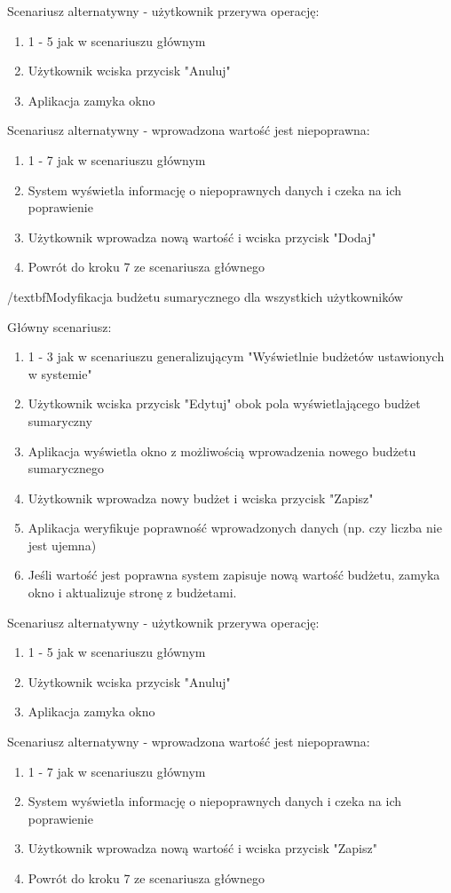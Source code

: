 Scenariusz alternatywny - użytkownik przerywa operację:
\begin{enumerate}
  \item 1 - 5 jak w scenariuszu głównym
  \item Użytkownik wciska przycisk "Anuluj"
  \item Aplikacja zamyka okno
\end{enumerate}

Scenariusz alternatywny - wprowadzona wartość jest niepoprawna:
\begin{enumerate}
  \item 1 - 7 jak w scenariuszu głównym
  \item System wyświetla informację o niepoprawnych danych i czeka na ich poprawienie
  \item Użytkownik wprowadza nową wartość i wciska przycisk "Dodaj"
  \item Powrót do kroku 7 ze scenariusza głównego
\end{enumerate}

 /textbf{Modyfikacja budżetu sumarycznego dla wszystkich użytkowników}

Główny scenariusz:
\begin{enumerate}
  \item 1 - 3 jak w scenariuszu generalizującym "Wyświetlnie budżetów ustawionych w systemie"
  \item Użytkownik wciska przycisk "Edytuj" obok pola wyświetlającego budżet sumaryczny
  \item Aplikacja wyświetla okno z możliwością wprowadzenia nowego budżetu sumarycznego
  \item Użytkownik wprowadza nowy budżet i wciska przycisk "Zapisz"
  \item Aplikacja weryfikuje poprawność wprowadzonych danych (np. czy liczba nie jest ujemna)
  \item Jeśli wartość jest poprawna system zapisuje nową wartość budżetu, zamyka okno i aktualizuje stronę z budżetami.
\end{enumerate}

Scenariusz alternatywny - użytkownik przerywa operację:
\begin{enumerate}
  \item 1 - 5 jak w scenariuszu głównym
  \item Użytkownik wciska przycisk "Anuluj"
  \item Aplikacja zamyka okno
\end{enumerate}

Scenariusz alternatywny - wprowadzona wartość jest niepoprawna:
\begin{enumerate}
  \item 1 - 7 jak w scenariuszu głównym
  \item System wyświetla informację o niepoprawnych danych i czeka na ich poprawienie
  \item Użytkownik wprowadza nową wartość i wciska przycisk "Zapisz"
  \item Powrót do kroku 7 ze scenariusza głównego
\end{enumerate}


